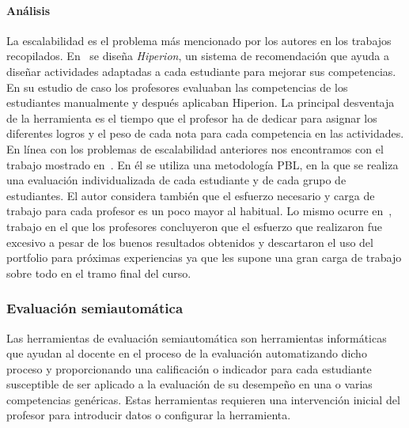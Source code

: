 \paragraph*{Análisis}
La escalabilidad es el problema más mencionado por los autores en los trabajos recopilados. En~\cite{serrano2013hiperion} se diseña \emph{Hiperion}, un sistema de recomendación que ayuda a diseñar actividades adaptadas a cada estudiante para mejorar sus competencias. En su estudio de caso los profesores evaluaban las competencias de los estudiantes manualmente y después aplicaban Hiperion. La principal desventaja de la herramienta es el tiempo que el profesor ha de dedicar para asignar los diferentes logros y el peso de cada nota para cada competencia en las actividades. En línea con los problemas de escalabilidad anteriores nos encontramos con el trabajo mostrado en~\cite{lacuesta2009active}. En él se utiliza una metodología PBL, en la que se realiza una evaluación individualizada de cada estudiante y de cada grupo de estudiantes. El autor considera también que el esfuerzo necesario y carga de trabajo para cada profesor es un poco mayor al habitual. Lo mismo ocurre en~\cite{benlloch2007adapting}, trabajo en el que los profesores concluyeron que el esfuerzo que realizaron fue excesivo a pesar de los buenos resultados obtenidos y descartaron el uso del portfolio para próximas experiencias ya que les supone una gran carga de trabajo sobre todo en el tramo final del curso.

\subsubsection{Evaluación semiautomática}

Las herramientas de evaluación semiautomática son herramientas informáticas que ayudan al docente en el proceso de la evaluación automatizando dicho proceso y proporcionando una calificación o indicador para cada estudiante susceptible de ser aplicado a la evaluación de su desempeño en una o varias competencias genéricas. Estas herramientas requieren una intervención inicial del profesor para introducir datos o configurar la herramienta. %

